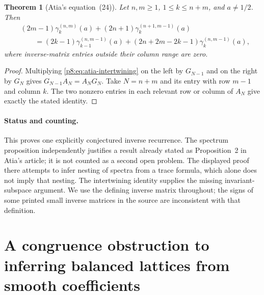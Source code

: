 \documentclass[11pt,a4paper]{article}
\newtheorem{theorem}{Theorem}[section]
\theoremstyle{definition}
\theoremstyle{remark}
\numberwithin{equation}{section}
\begin{document}
\begin{theorem}[Atia's equation~(24)]
\label{p8:thm:atia-recurrence}
Let $n,m\geq1$, $1\leq k\leq n+m$, and $a\ne1/2$.
Then
\begin{align*}
 &(2m-1)\gamma_k^{(n,m)}(a)
 +(2n+1)\gamma_k^{(n+1,m-1)}(a)\\
 &\qquad=(2k-1)\gamma_{k-1}^{(n,m-1)}(a)
 +(2n+2m-2k-1)\gamma_k^{(n,m-1)}(a),
\end{align*}
where inverse-matrix entries outside their column range are zero.
\end{theorem}
\begin{proof}
Multiplying \eqref{p8:eq:atia-intertwining} on the left by $G_{N-1}$
and on the right by $G_N$ gives
$G_{N-1}A_N=A_NG_N$.
Take $N=n+m$ and its entry with row $m-1$ and column $k$.
The two nonzero entries in each relevant row or column of $A_N$
give exactly the stated identity.
\end{proof}

\paragraph{Status and counting.}
This proves one explicitly conjectured inverse recurrence.
The spectrum proposition independently justifies a result already stated
as Proposition~2 in Atia's article; it is not counted as a second open
problem.  The displayed proof there attempts to infer nesting of spectra
from a trace formula, which alone does not imply that nesting.
The intertwining identity supplies the missing invariant-subspace
argument.  We use the defining inverse matrix throughout; the signs of
some printed small inverse matrices in the source are inconsistent with
that definition.

\section[Congruence obstructions for balanced lattices]{A congruence obstruction to inferring balanced lattices from smooth coefficients}
\label{p8:ntf:section}
\end{document}
